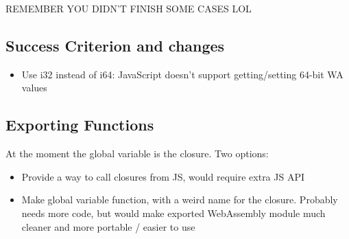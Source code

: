 \documentclass{report}
\begin{document}
REMEMBER YOU DIDN'T FINISH SOME CASES LOL

\subsection{Success Criterion and changes}

\begin{itemize}
	\item Use i32 instead of i64: JavaScript doesn't support getting/setting 64-bit WA values
\end{itemize}

\subsection{Exporting Functions}
At the moment the global variable is the closure. Two options:
\begin{itemize}
	\item Provide a way to call closures from JS, would require extra JS API
	\item Make global variable function, with a weird name for the closure. Probably needs more code, but would make exported WebAssembly module much cleaner and more portable / easier to use
\end{itemize}
\end{document}
